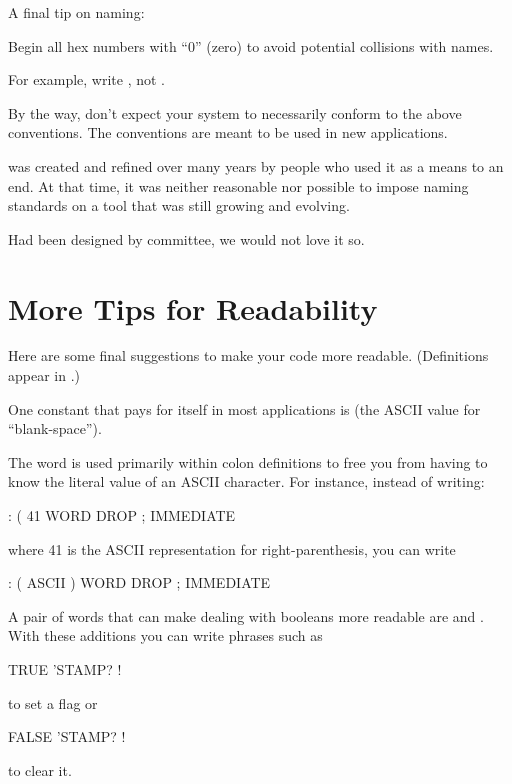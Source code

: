 \medbreak
A final tip on naming:
\begin{tip}
Begin all hex numbers with ``0'' (zero) to avoid potential collisions
with names.
\end{tip}
For example, write , not .%
%

By the way, don't expect your \Forth{} system to necessarily conform
to the above conventions.  The conventions are meant to be used in
new applications.

\Forth{} was created and refined over many years by people who used it
as a means to an end.  At that time, it was neither reasonable nor
possible to impose naming standards on a tool that was still growing
and evolving.

Had \Forth{} been designed by committee, we would not love it so.%
%

\section{More Tips for Readability}

Here are some final suggestions to make your code more readable.
(Definitions appear in .)

One constant that pays for itself in most applications is
(the ASCII value for ``blank-space'').

The word  is used primarily within colon definitions to
free you from having to know the literal value of an ASCII character.
For instance, instead of writing:
\begin{Code}
: (    41 WORD  DROP ;  IMMEDIATE
\end{Code}
where 41 is the ASCII representation for right-parenthesis, you can
write
\begin{Code}
: (    ASCII ) WORD  DROP ;  IMMEDIATE
\end{Code}
%
%
A pair of words that can make dealing with booleans more readable are
 and .  With these additions you can write
phrases such as

\begin{Code}
TRUE 'STAMP? !
\end{Code}
to set a flag or
\begin{Code}
FALSE 'STAMP? !
\end{Code}
to clear it.

